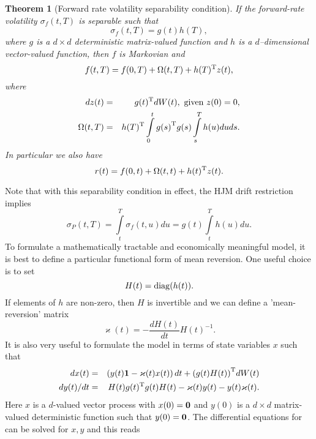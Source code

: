 \documentclass[11pt,a4paper]{article}
\theoremstyle{break} %
\newtheorem{theorem}{Theorem}[section]
\numberwithin{equation}{section}
\begin{document}
\begin{theorem}[Forward rate volatility separability condition]
If the forward-rate volatility ${\sigma _f}(t,T)$ is separable such that
\begin{equation*}
  {\sigma _f}(t,T) = g(t)h(T),
\end{equation*}
where $g$ is a $d \times d$ deterministic matrix-valued function and $h$ is a $d$--dimensional vector-valued function,
then $f$ is Markovian and
\begin{equation*}
  f(t,T) = f(0,T) + \Omega (t,T) + h{(T)^{\rm{T}}}z(t),
\end{equation*}
where
\begin{eqnarray*}
dz(t) &=& g{(t)^{\rm{T}}}dW(t), \text{ given } z(0) = 0,\\
\Omega (t,T) &=& h{(T)^{\rm{T}}}\int\limits_0^t {g{{(s)}^{\rm{T}}}g(s)\int\limits_s^T {h(u)du} ds}.
\end{eqnarray*}
In particular we also have
\begin{equation*}
  r(t) = f(0,t) + \Omega (t,t) + h{(t)^{\rm{T}}}z(t).
\end{equation*}
\end{theorem}
Note that with this separability condition in effect, the HJM drift restriction implies
\begin{equation}\label{eq:sigmaP_gaussian2f}
  {\sigma _P}(t,T) = \int\limits_t^T {{\sigma _f}(t,u)du}  = g(t)\int\limits_t^T {h(u)du}.
\end{equation}
To formulate a mathematically tractable and economically meaningful model, it is best to define a particular functional form of mean reversion. One useful choice is to set
\begin{equation*}
  H(t) = {\rm{diag}}(h(t)).
\end{equation*}
If elements of $h$ are non-zero, then $H$ is invertible and we can define a 'mean-reversion' matrix
\begin{equation}\label{eq:MR_mat_gaussian}
  \varkappa(t)  =  - \frac{{dH(t)}}{{dt}}H{(t)^{ - 1}}.
\end{equation}
It is also very useful to formulate the model in terms of state variables $x$ such that
\begin{eqnarray}
dx(t) &=& \left( {y(t){\bf{1}} - \varkappa (t)x(t)} \right)dt + {\left( {g(t)H(t)} \right)^{\rm{T}}}dW(t)\nonumber \\
dy(t)/dt &=& H(t)g{(t)^{\rm{T}}}g(t)H(t) - \varkappa (t)y(t) - y(t)\varkappa (t).\label{eq:dx_dy_gaussian2f}
\end{eqnarray}
Here $x$ is a $d$-valued vector process with $x(0) = {\bf{0}}$ and $y(0)$ is a $d \times d$ matrix-valued deterministic function such that $y(0)={\bf{0}}$. The differential equations for can be solved for $x, y$ and this reads
\end{document}
